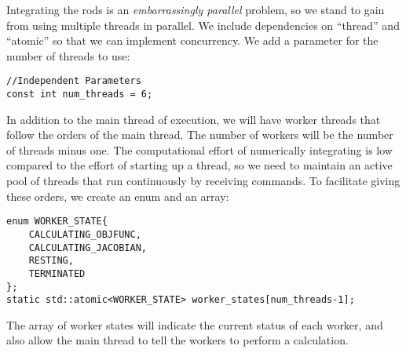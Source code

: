 \documentclass[12pt]{article}
\begin{document}
Integrating the rods is an \emph{embarrassingly parallel} problem, so we stand to gain from using multiple threads in parallel. We include dependencies on ``thread'' and ``atomic'' so that we can implement concurrency. We add a parameter for the number of threads to use:
\begin{lstlisting}
//Independent Parameters
const int num_threads = 6;
\end{lstlisting}
In addition to the main thread of execution, we will have worker threads that follow the orders of the main thread. The number of workers will be the number of threads minus one. The computational effort of numerically integrating is low compared to the effort of starting up a thread, so we need to maintain an active pool of threads that run continuously by receiving commands. To facilitate giving these orders, we create an enum and an array:
\newpage
\begin{lstlisting}
enum WORKER_STATE{
    CALCULATING_OBJFUNC,
    CALCULATING_JACOBIAN,
    RESTING,
    TERMINATED
};
static std::atomic<WORKER_STATE> worker_states[num_threads-1];
\end{lstlisting}
The array of worker states will indicate the current status of each worker, and also allow the main thread to tell the workers to perform a calculation.
\end{document}
